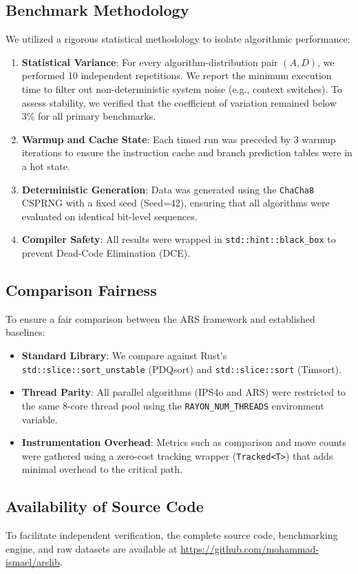 \subsection{Benchmark Methodology}
We utilized a rigorous statistical methodology to isolate algorithmic performance:
\begin{enumerate}
    \item \textbf{Statistical Variance}: For every algorithm-distribution pair $(A, D)$, we performed 10 independent repetitions. We report the minimum execution time to filter out non-deterministic system noise (e.g., context switches). To assess stability, we verified that the coefficient of variation remained below 3\% for all primary benchmarks.
    \item \textbf{Warmup and Cache State}: Each timed run was preceded by 3 warmup iterations to ensure the instruction cache and branch prediction tables were in a hot state.
    \item \textbf{Deterministic Generation}: Data was generated using the \texttt{ChaCha8} CSPRNG with a fixed seed (Seed=42), ensuring that all algorithms were evaluated on identical bit-level sequences.
    \item \textbf{Compiler Safety}: All results were wrapped in \texttt{std::hint::black\_box} to prevent Dead-Code Elimination (DCE).
\end{enumerate}

\subsection{Comparison Fairness}
To ensure a fair comparison between the ARS framework and established baselines:
\begin{itemize}
    \item \textbf{Standard Library}: We compare against Rust's \texttt{std::slice::sort\_unstable} (PDQsort) and \texttt{std::slice::sort} (Timsort).
    \item \textbf{Thread Parity}: All parallel algorithms (IPS4o and ARS) were restricted to the same 8-core thread pool using the \texttt{RAYON\_NUM\_THREADS} environment variable.
    \item \textbf{Instrumentation Overhead}: Metrics such as comparison and move counts were gathered using a zero-cost tracking wrapper (\texttt{Tracked<T>}) that adds minimal overhead to the critical path.
\end{itemize}

\subsection{Availability of Source Code}
To facilitate independent verification, the complete source code, benchmarking engine, and raw datasets are available at \url{https://github.com/mohammad-ismael/arslib}.
